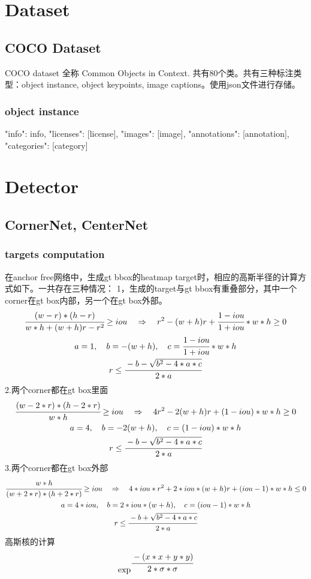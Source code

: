 \documentclass{article}
\begin{document}
\section{Dataset}
\subsection{COCO Dataset}
COCO dataset 全称 Common Objects in Context. 共有80个类。共有三种标注类型：object instance, object keypoints, image captions。使用json文件进行存储。
\subsubsection{object instance}
{
    "info": info,
    "licenses": [license],
    "images": [image],
    "annotations": [annotation],
    "categories": [category]
}

\section{Detector}
\subsection{CornerNet, CenterNet}
\subsubsection{targets computation}
在anchor free网络中，生成gt bbox的heatmap target时，相应的高斯半径的计算方式如下。一共存在三种情况：
1，生成的target与gt bbox有重叠部分，其中一个corner在gt box内部，另一个在gt box外部。
\begin{gather}
        \cfrac{(w-r)*(h-r)}{w*h+(w+h)r-r^2} \ge {iou} \quad\Rightarrow\quad
        {r^2-(w+h)r+\cfrac{1-iou}{1+iou}*w*h} \ge 0 \\
        {a} = 1,\quad{b} = {-(w+h)},\quad{c} = {\cfrac{1-iou}{1+iou}*w*h} \\
        {r} \le \cfrac{-b-\sqrt{b^2-4*a*c}}{2*a}
\end{gather}
2.两个corner都在gt box里面
\begin{gather}
\cfrac{(w-2*r)*(h-2*r)}{w*h} \ge {iou} \quad\Rightarrow\quad
        {4r^2-2(w+h)r+(1-iou)*w*h} \ge 0 \\
        {a} = 4,\quad {b} = {-2(w+h)},\quad {c} = {(1-iou)*w*h} \\
        {r} \le \cfrac{-b-\sqrt{b^2-4*a*c}}{2*a}
\end{gather}
3.两个corner都在gt box外部
\begin{gather}
\cfrac{w*h}{(w+2*r)*(h+2*r)} \ge {iou} \quad\Rightarrow\quad
        {4*iou*r^2+2*iou*(w+h)r+(iou-1)*w*h} \le 0 \\
        {a} = {4*iou},\quad {b} = {2*iou*(w+h)},\quad {c} = {(iou-1)*w*h} \\
        {r} \le \cfrac{-b+\sqrt{b^2-4*a*c}}{2*a}
\end{gather}
高斯核的计算
\begin{align}
\exp^{\cfrac{-(x*x+y*y)}{2*\sigma*\sigma}}
\end{align}
\end{document}
